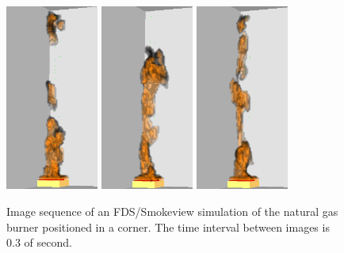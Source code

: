 \documentclass[twoside]{uocthesis}
\begin{document}
{\begin{figure}[p]
	\includegraphics[width=1.2in]{../Figures/FDSNG_Corner7}
	\includegraphics[width=1.2in]{../Figures/FDSNG_Corner8}
	\includegraphics[width=1.2in]{../Figures/FDSNG_Corner9} \\
	

	\caption[Image sequence of an FDS/Smokeview simulation of the natural gas burner positioned in a corner.]{Image sequence of an FDS/Smokeview simulation of the natural gas burner positioned in a corner. The time interval between images is 0.3 of second.}
	\label{GBNG34Sequence}
\end{figure}

}
\end{document}

